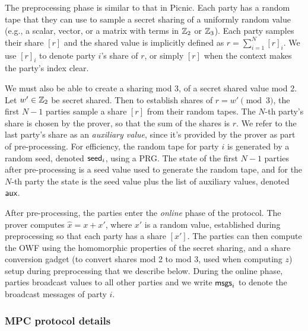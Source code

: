 The preprocessing phase is similar to that in Picnic.  Each party has a random
tape that they can use to sample a secret sharing of a uniformly random value
(e.g.,  a scalar, vector, or a matrix with terms in $\mathbb{Z}_2$ or $\mathbb{Z}_3$).  Each
party samples their share $[r]$ and the shared value is implicitly defined as
$r = \sum_{i=1}^N [r]_i$.  We use $[r]_i$ to denote party $i$'s share of $r$,
or simply $[r]$ when the context makes the party's index clear.

We must also be able to create a sharing mod 3, of a secret shared value mod 2.
Let $w'\in\mathbb{Z}_2$ be secret shared.  Then to establish shares of $r = w' \pmod
3$, the first $N-1$ parties sample a share $[r]$ from their random tapes. The
$N$-th party's share is chosen by the prover, so that the sum of the shares is
$r$.  We refer to the last party's share as an \emph{auxiliary value}, since
it's provided by the prover as part of pre-processing.  For efficiency, the random
tape for  party $i$ is
generated by a random seed, denoted $\textsf{seed}_i$, using a PRG. The state of the first
$N-1$ parties after pre-processing is a seed value used to generate the random
tape, and for the $N$-th party the state is the seed value plus the list of
auxiliary values, denoted $\textsf{aux}$. 

After pre-processing, the parties enter the \emph{online} phase of the protocol. 
The prover computes $\hat{x}= x + x'$, where $x'$ is a random value, established during
preprocessing so that each party has a share $[x']$. 
The parties can then compute the OWF using the homomorphic properties of the secret sharing, 
and a share conversion gadget (to convert shares mod 2 to mod 3, used when computing $z$)
setup during preprocessing that we describe below. 
During the online phase, parties broadcast values to all other parties and we write $\textsf{msgs}_i$
to denote the broadcast messages of party $i$. 

\subsubsection{MPC protocol details}

